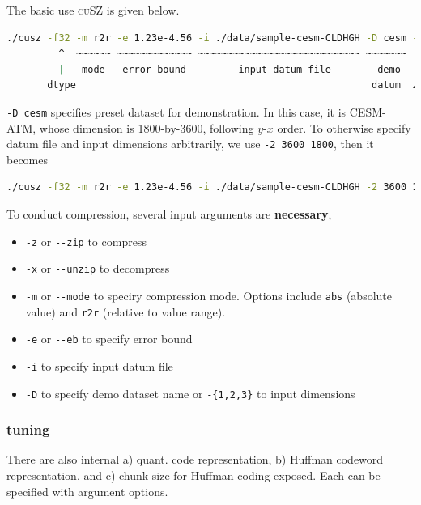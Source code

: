 The basic use \textsc{cuSZ} is given below.

\begin{lstlisting}[language=bash]
./cusz -f32 -m r2r -e 1.23e-4.56 -i ./data/sample-cesm-CLDHGH -D cesm -z -x
         ^  ~~~~~~ ~~~~~~~~~~~~~ ~~~~~~~~~~~~~~~~~~~~~~~~~~~~ ~~~~~~~  ^  ^ 
         |   mode   error bound         input datum file        demo   |  |
       dtype                                                   datum  zip unzip
\end{lstlisting}

\passthrough{\lstinline!-D cesm!} specifies preset dataset for
demonstration. In this case, it is CESM-ATM, whose dimension is
1800-by-3600, following \(y\text{-}x\) order. To otherwise specify datum
file and input dimensions arbitrarily, we use
\passthrough{\lstinline!-2 3600 1800!}, then it becomes

\begin{lstlisting}[language=bash]
./cusz -f32 -m r2r -e 1.23e-4.56 -i ./data/sample-cesm-CLDHGH -2 3600 1800 -z -x
\end{lstlisting}

To conduct compression, several input arguments are \textbf{necessary},

\begin{itemize}
\tightlist
\item
  \passthrough{\lstinline!-z!} or \passthrough{\lstinline!--zip!} to
  compress
\item
  \passthrough{\lstinline!-x!} or \passthrough{\lstinline!--unzip!} to
  decompress
\item
  \passthrough{\lstinline!-m!} or \passthrough{\lstinline!--mode!} to
  speciry compression mode. Options include
  \passthrough{\lstinline!abs!} (absolute value) and
  \passthrough{\lstinline!r2r!} (relative to value range).
\item
  \passthrough{\lstinline!-e!} or \passthrough{\lstinline!--eb!} to
  specify error bound
\item
  \passthrough{\lstinline!-i!} to specify input datum file
\item
  \passthrough{\lstinline!-D!} to specify demo dataset name or
  \passthrough{\lstinline!-\{1,2,3\}!} to input dimensions
\end{itemize}

\subsubsection{tuning}

There are also internal a) quant. code representation, b) Huffman
codeword representation, and c) chunk size for Huffman coding exposed.
Each can be specified with argument options.

